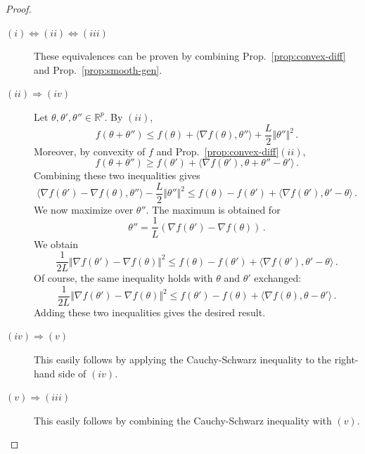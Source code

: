 \documentclass[11pt,reqno]{article}
\newcommand{\R}{\mathbb{R}}
\renewcommand{\leq}{\leqslant}
\renewcommand{\geq}{\geqslant}
\numberwithin{equation}{section}
\theoremstyle{plain}
\theoremstyle{definition}
\theoremstyle{remark}
\begin{document}
\begin{proof}
	\begin{description}
		\item[$(i) \Leftrightarrow (ii) \Leftrightarrow (iii)$] These equivalences can be proven by combining Prop.~\ref{prop:convex-diff} and Prop.~\ref{prop:smooth-gen}. 
		\item[$(ii)\Rightarrow(iv)$] Let $\theta, \theta', \theta'' \in \R^p$. By $(ii)$, 
		\begin{equation*}
			f(\theta + \theta'') \leq f(\theta) + \langle \nabla f(\theta), \theta'' \rangle + \frac{L}{2} \Vert \theta'' \Vert^2 \, .
		\end{equation*}
		Moreover, by convexity of $f$ and Prop.~\ref{prop:convex-diff}$(ii)$, 
		\begin{equation*}
			f(\theta + \theta'') \geq f(\theta') + \langle \nabla f(\theta'), \theta + \theta'' - \theta' \rangle \, .
		\end{equation*}
		Combining these two inequalities gives
		\begin{equation*}
			\langle \nabla f(\theta') - \nabla f(\theta), \theta'' \rangle - \frac{L}{2} \Vert \theta'' \Vert^2 \leq f(\theta) - f(\theta') + \langle \nabla f(\theta'), \theta' - \theta \rangle \, .
		\end{equation*}
		We now maximize over $\theta''$. The maximum is obtained for
		\begin{equation*}
			\theta'' = \frac{1}{L}\left(\nabla f(\theta') - \nabla f(\theta)\right) \, .
		\end{equation*}
		We obtain 
		\begin{equation*}
			\frac{1}{2L} \Vert \nabla f(\theta') - \nabla f(\theta) \Vert^2 \leq f(\theta) - f(\theta') + \langle \nabla f(\theta'), \theta' - \theta \rangle \, .
		\end{equation*}
		Of course, the same inequality holds with $\theta$ and $\theta'$ exchanged:
		\begin{equation*}
			\frac{1}{2L} \Vert \nabla f(\theta') - \nabla f(\theta) \Vert^2 \leq f(\theta') - f(\theta) + \langle \nabla f(\theta), \theta - \theta' \rangle \, .
		\end{equation*}
		Adding these two inequalities gives the desired result.
		\item[$(iv) \Rightarrow (v)$] This easily follows by applying the Cauchy-Schwarz inequality to the right-hand side of $(iv)$.
		\item[$(v) \Rightarrow (iii)$] This easily follows by combining the Cauchy-Schwarz inequality with $(v)$.
	\end{description}
\end{proof}
\end{document}
